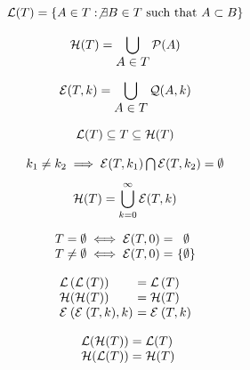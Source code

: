 \begin{definition}
	\[ \mathcal{L}(T) = \{A \in T : \not\exists B \in T \text{ such that } A \subset B\} \]
\end{definition}

\begin{definition}
	\[ \mathcal{H}(T) = \displaystyle \bigcup \limits_{\displaystyle A \in T} \mathcal{P}(A) \]
\end{definition}

\begin{definition}
	\[ \mathcal{E}(T,k) = \displaystyle \bigcup \limits_{\displaystyle A \in T} \mathcal{Q}(A,k) \]
\end{definition}

\begin{corollary}
	\[ \mathcal{L}(T) \subseteq T \subseteq \mathcal{H}(T) \]
\end{corollary}

\begin{corollary}
	\[\begin{array}{c}
		k_1 \neq k_2 \implies \mathcal{E}(T,k_1) \bigcap \mathcal{E}(T,k_2) = \emptyset \\ [8pt]
		\mathcal{H}(T) = \displaystyle \bigcup \limits_{k = 0}^{\infty} \mathcal{E}(T,k)
	\end{array}\]
\end{corollary}

\begin{remark}
	\[\begin{array}{l@{\ }c}
		T = \emptyset \iff \Ecal(T,0) =& \emptyset \\
		T \neq \emptyset \iff \Ecal(T,0) =& \{\emptyset\}
	\end{array}\]
\end{remark}

\begin{corollary}
	\[\begin{array}{l@{}l@{}l@{\ }l@{}l}
		\Lcal&(\Lcal&(T)) &= \Lcal&(T) \\
		\Hcal&(\Hcal&(T)) &= \Hcal&(T) \\
		\Ecal&(\Ecal&(T,k),k) &= \Ecal&(T,k)
	\end{array}\]
\end{corollary}

\begin{lemma}
	\[\begin{array}{l@{}l@{}l@{}l}
		\Lcal(\Hcal(T)) = \Lcal(T) \\
		\Hcal(\Lcal(T)) = \Hcal(T)
	\end{array}\]
\end{lemma}

